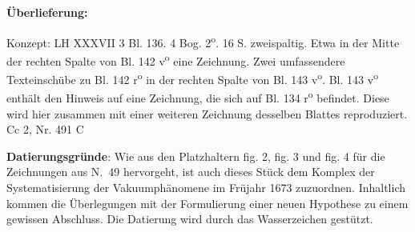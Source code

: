       
               
                \begin{ledgroupsized}[r]{120mm}
                \footnotesize 
                \pstart                
                \noindent\textbf{\"{U}berlieferung:}   
                \pend
                \end{ledgroupsized}
            
              
                            \begin{ledgroupsized}[r]{114mm}
                            \footnotesize 
                            \pstart \parindent -6mm
                            Konzept: LH XXXVII 3 Bl. 136. 4 Bog. 2\textsuperscript{o}. 16 S. zweispaltig. Etwa in der Mitte der rechten Spalte von Bl. 142 v\textsuperscript{o} eine Zeichnung. Zwei umfassendere Texteinsch\"{u}be zu Bl. 142 r\textsuperscript{o} in der rechten Spalte von Bl. 143 v\textsuperscript{o}. Bl. 143 v\textsuperscript{o} enth\"{a}lt den Hinweis auf eine Zeichnung, die sich auf Bl. 134 r\textsuperscript{o} befindet. Diese wird hier zusammen mit einer weiteren Zeichnung desselben Blattes reproduziert.\\Cc 2, Nr. 491 C \pend
                            \end{ledgroupsized}
                \vspace*{5mm}
                \begin{ledgroup}
                \footnotesize 
                \pstart
            \noindent\footnotesize{\textbf{Datierungsgr\"{u}nde}: Wie aus den Platzhaltern fig. 2, fig. 3 und fig. 4 f\"{u}r die Zeichnungen aus N.~49\raisebox{-0.5ex}{\notsotiny 2} hervorgeht, ist auch dieses St\"{u}ck dem Komplex der Systematisierung der Vakuumph\"{a}nomene im Fr\"{u}jahr 1673 zuzuordnen. Inhaltlich kommen die \"{U}berlegungen mit der Formulierung einer neuen Hypothese zu einem gewissen Abschluss. Die Datierung wird durch das Wasserzeichen gest\"{u}tzt.}
                \pend
                \end{ledgroup}
            
